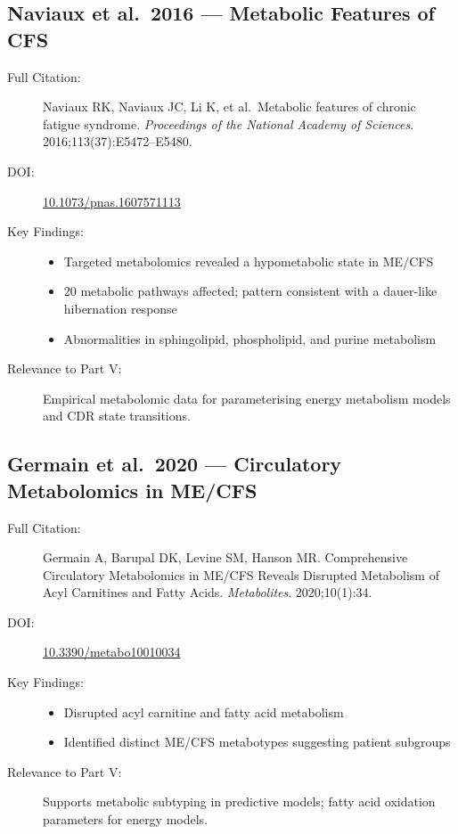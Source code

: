 \subsection{Naviaux et al.\ 2016 --- Metabolic Features of CFS}

\begin{description}
    \item[Full Citation:] Naviaux RK, Naviaux JC, Li K, et al.\ Metabolic features of chronic fatigue syndrome. \textit{Proceedings of the National Academy of Sciences}. 2016;113(37):E5472--E5480. \cite{Naviaux2016metabolomics}
    \item[DOI:] \href{https://doi.org/10.1073/pnas.1607571113}{10.1073/pnas.1607571113}
    \item[Key Findings:]
    \begin{itemize}
        \item Targeted metabolomics revealed a hypometabolic state in ME/CFS
        \item 20 metabolic pathways affected; pattern consistent with a dauer-like hibernation response
        \item Abnormalities in sphingolipid, phospholipid, and purine metabolism
    \end{itemize}
    \item[Relevance to Part V:] Empirical metabolomic data for parameterising energy metabolism models and CDR state transitions.
\end{description}

\subsection{Germain et al.\ 2020 --- Circulatory Metabolomics in ME/CFS}

\begin{description}
    \item[Full Citation:] Germain A, Barupal DK, Levine SM, Hanson MR. Comprehensive Circulatory Metabolomics in ME/CFS Reveals Disrupted Metabolism of Acyl Carnitines and Fatty Acids. \textit{Metabolites}. 2020;10(1):34. \cite{Germain2020metabolic}
    \item[DOI:] \href{https://doi.org/10.3390/metabo10010034}{10.3390/metabo10010034}
    \item[Key Findings:]
    \begin{itemize}
        \item Disrupted acyl carnitine and fatty acid metabolism
        \item Identified distinct ME/CFS metabotypes suggesting patient subgroups
    \end{itemize}
    \item[Relevance to Part V:] Supports metabolic subtyping in predictive models; fatty acid oxidation parameters for energy models.
\end{description}

